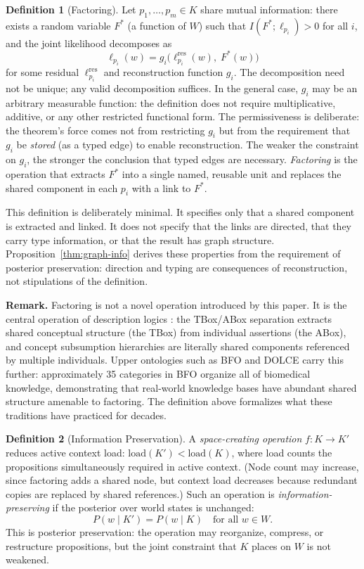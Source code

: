 \documentclass[11pt]{article}
\theoremstyle{definition}
\newtheorem{definition}{Definition}
\begin{document}
\begin{definition}[Factoring]
\label{def:factoring}
Let $p_1, \ldots, p_m \in K$ share mutual information: there exists a
random variable $F^*$ (a function of $W$) such that
$I(F^*; \ell_{p_i}) > 0$ for all $i$, and the joint likelihood
decomposes as
\[
\ell_{p_i}(w) = g_i\!\bigl(\ell_{p_i}^{\text{res}}(w),\; F^*(w)\bigr)
\]
for some residual $\ell_{p_i}^{\text{res}}$ and reconstruction function
$g_i$. The decomposition need not be unique; any valid decomposition
suffices. In the general case, $g_i$ may be an arbitrary measurable
function: the definition does not require multiplicative,
additive, or any other restricted functional form. The permissiveness
is deliberate: the theorem's force comes not from restricting $g_i$
but from the requirement that $g_i$ be \emph{stored} (as a typed edge)
to enable reconstruction. The weaker the constraint on $g_i$, the
stronger the conclusion that typed edges are necessary.
\emph{Factoring} is the operation that extracts $F^*$ into a single
named, reusable unit and replaces the shared component in each $p_i$
with a link to $F^*$.

This definition is deliberately minimal. It specifies only that a
shared component is extracted and linked. It does not specify that
the links are directed, that they carry type information, or that
the result has graph structure. Proposition~\ref{thm:graph-info}
derives these properties from the requirement of posterior
preservation: direction and typing are consequences of
reconstruction, not stipulations of the definition.

\textbf{Remark.} Factoring is not a novel operation introduced by this
paper. It is the central operation of description logics
\cite{BaaderCalvaneseEtAl2003}: the TBox/ABox separation extracts shared
conceptual structure (the TBox) from individual assertions (the ABox),
and concept subsumption hierarchies are literally shared components
referenced by multiple individuals. Upper ontologies such as BFO
\cite{Arp2015} and DOLCE \cite{Masolo2003} carry this further:
approximately 35 categories in BFO organize all of biomedical knowledge,
demonstrating that real-world knowledge bases have abundant shared
structure amenable to factoring. The definition above formalizes what
these traditions have practiced for decades.
\end{definition}

\begin{definition}[Information Preservation]
\label{def:preservation}
A \emph{space-creating operation} $f : K \to K'$ reduces active context
load: $\mathrm{load}(K') < \mathrm{load}(K)$, where load counts the
propositions simultaneously required in active context. (Node count may
increase, since factoring adds a shared node, but context load decreases
because redundant copies are replaced by shared references.) Such an
operation is \emph{information-preserving} if the posterior over world
states is unchanged:
\[
P(w \mid K') = P(w \mid K) \quad \text{for all } w \in W.
\]
This is posterior preservation: the operation may reorganize, compress,
or restructure propositions, but the joint constraint that $K$ places
on $W$ is not weakened.
\end{definition}
\end{document}
